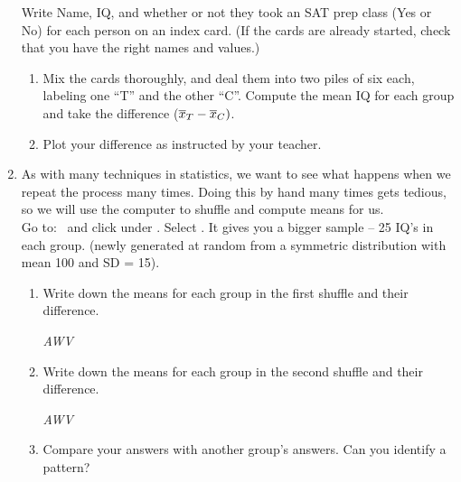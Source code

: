 \begin{enumerate}
Write Name, IQ, and whether or not they took an SAT prep class (Yes or
No) for each person on an index card.
(If the cards are already started, check that you have the right
names and values.)  
   \begin{enumerate}
   \item Mix the cards thoroughly, and deal them into two piles of six
     each, labeling one ``T'' and the other ``C''.
     Compute the mean IQ for each group and take the difference
     ($\overline{x}_T - \overline{x}_C)$.\vspace{1cm}
   \item Plot your difference as instructed by your teacher. \vspace{1cm} 
\end{enumerate}

\item As with many techniques in statistics, we want to see what
  happens when we repeat the process many times.  Doing this by hand
  many times gets tedious, so we will use the computer to shuffle and
  compute means for us. \\ Go to:
  \webAppURLFrst\  and click
    under .
   Select . It gives you a bigger sample -- 25 IQ's in each
   group. (newly generated at random from a symmetric distribution
   with mean 100 and SD = 15).
   \begin{enumerate}
   \item Write down the means for each group in the first shuffle and
     their difference.
\begin{students}
 \vspace{1cm}
\end{students}

\begin{key}
 {\it AWV}
\end{key}

   \item Write down the means for each group in the second shuffle and
     their difference.
\begin{students}
 \vspace{1cm}
\end{students}

\begin{key}
 {\it AWV}
\end{key}
\item Compare your answers with another group's answers.  Can you
  identify a pattern?
\begin{students}
 \vspace{1cm}
\end{students}


\end{enumerate}
\end{enumerate}

